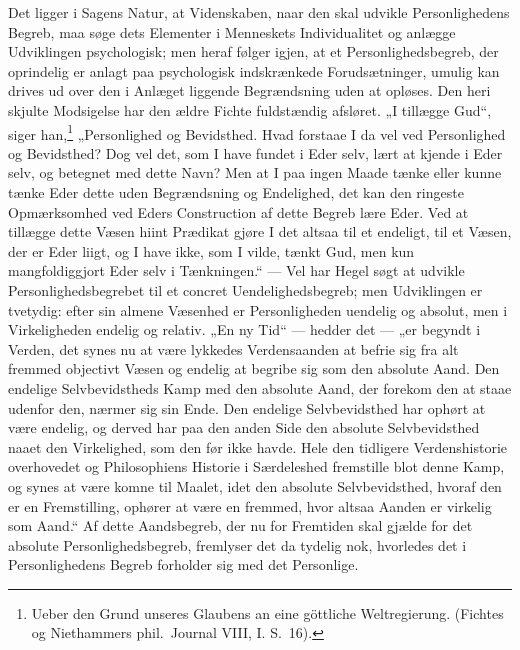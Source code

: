 \documentclass[12pt]{book}
\begin{document}
Det ligger i Sagens Natur, at Videnskaben, naar den skal udvikle
Personlighedens Begreb, maa søge dets Elementer i Menneskets
Individualitet og anlægge Udviklingen
psychologisk; men heraf følger igjen, at et Personlighedsbegreb, der
oprindelig er anlagt paa psychologisk indskrænkede Forudsætninger,
umulig kan drives ud over den i Anlæget liggende Begrændsning uden
at opløses. Den heri skjulte Modsigelse har den ældre Fichte
fuldstændig afsløret. „I tillægge Gud“, siger
han,\footnote{Ueber den Grund unseres Glaubens an eine göttliche
Weltregierung. (Fichtes og Niethammers phil.\ Journal VIII, I.
S.\ 16).} „Personlighed og Bevidsthed. Hvad forstaae I da vel ved
Personlighed og Bevidsthed? Dog vel det, som I have fundet i Eder
selv, lært at kjende i Eder selv, og betegnet med dette Navn? Men at
I paa ingen Maade tænke eller kunne tænke Eder dette uden
Begrændsning og Endelighed, det kan den ringeste Opmærksomhed ved
Eders Construction af dette Begreb lære Eder. Ved at tillægge dette
Væsen hiint Prædikat gjøre I det altsaa til et endeligt, til et
Væsen, der er Eder liigt, og I have ikke, som I vilde, tænkt Gud,
men kun mangfoldiggjort Eder selv i Tænkningen.“ --- Vel har Hegel
søgt at udvikle Personlighedsbegrebet til et concret
Uendelighedsbegreb; men Udviklingen er tvetydig: efter sin almene
Væsenhed er Personligheden uendelig og absolut, men i Virkeligheden
endelig og relativ. „En ny Tid“ --- hedder det --- „er begyndt i
Verden, det synes nu at være lykkedes Verdensaanden at befrie sig
fra alt fremmed objectivt Væsen og endelig at begribe sig som den
absolute Aand. Den endelige Selvbevidstheds Kamp med den absolute
Aand, der forekom den at staae udenfor den, nærmer sig sin Ende. Den
endelige Selvbevidsthed har ophørt at være endelig, og derved har
paa den anden Side den absolute Selvbevidsthed naaet den
Virkelighed, som den før ikke havde. Hele den tidligere
Verdenshistorie overhovedet og Philosophiens Historie i Særdeleshed
fremstille blot denne Kamp, og synes at være komne
til Maalet, idet den absolute Selvbevidsthed, hvoraf den er en
Fremstilling, ophører at være en fremmed, hvor altsaa Aanden er
virkelig som Aand.“ Af dette Aandsbegreb, der nu for Fremtiden skal
gjælde for det absolute Personlighedsbegreb, fremlyser det da
tydelig nok, hvorledes det i Personlighedens Begreb forholder sig
med det Personlige.
\end{document}

